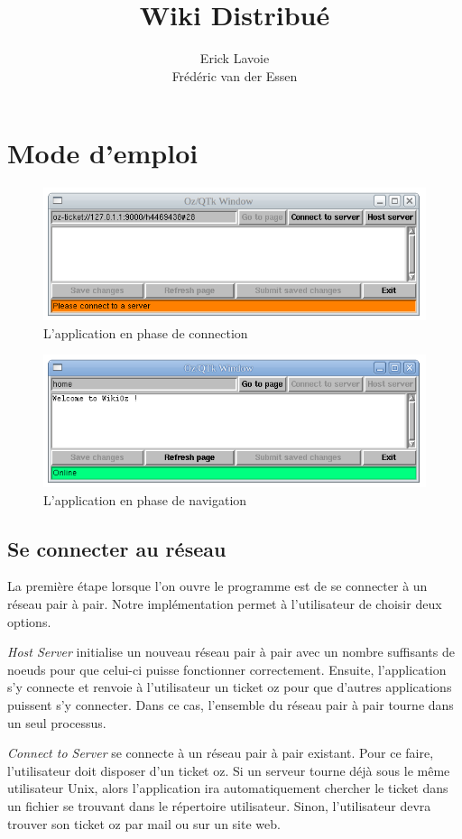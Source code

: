 \documentclass{article}
\title{ Wiki Distribué }
\author{ Erick Lavoie \\ Frédéric van der Essen}
\begin{document}
	\maketitle
	\section{Mode d'emploi} 
	\begin{figure}[h]
		\centering
		\includegraphics[scale=0.5]{connection.png}
		\caption{L'application en phase de connection}
	\end{figure}
	\begin{figure}[h]
		\centering
		\includegraphics[scale=0.5]{connected.png}
		\caption{L'application en phase de navigation}
	\end{figure}
	
	\subsection{Se connecter au réseau}
	La première étape lorsque l'on ouvre le programme est de se connecter
	à un réseau pair à pair. Notre implémentation permet à l'utilisateur de
	choisir deux options. 
	
	\emph{Host Server} initialise un nouveau réseau
	pair à pair avec un nombre suffisants de noeuds pour que celui-ci puisse
	fonctionner correctement. Ensuite, l'application s'y connecte et renvoie
	à l'utilisateur un ticket oz pour que d'autres applications puissent s'y
	connecter. Dans ce cas, l'ensemble du réseau pair à pair tourne dans
	un seul processus.
	
	\emph{Connect to Server} se connecte à un réseau pair à pair existant.
	Pour ce faire, l'utilisateur doit disposer d'un ticket oz. Si un serveur
	tourne déjà sous le même utilisateur Unix, alors l'application ira
	automatiquement chercher le ticket dans un fichier se trouvant dans
	le répertoire utilisateur. Sinon, l'utilisateur devra trouver son ticket
	oz par mail ou sur un site web. 
	
\end{document}
